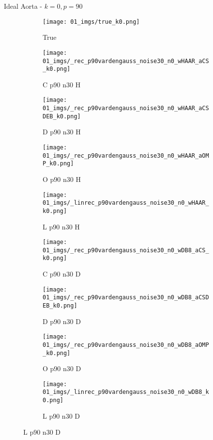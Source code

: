 \begin{frame}{Ideal Aorta - $k=0,p=90$}{}
\begin{figure}
\begin{subfigure}{0.1\textwidth}
\texttt{[image: 01\_imgs/true\_k0.png]}
\caption*{\Tiny True}
\end{subfigure}
\begin{subfigure}{0.1\textwidth}
\texttt{[image: 01\_imgs/\_rec\_p90vardengauss\_noise30\_n0\_wHAAR\_aCS\_k0.png]}
\caption*{\Tiny C p90 n30 H}
\end{subfigure}
\begin{subfigure}{0.1\textwidth}
\texttt{[image: 01\_imgs/\_rec\_p90vardengauss\_noise30\_n0\_wHAAR\_aCSDEB\_k0.png]}
\caption*{\Tiny D p90 n30 H}
\end{subfigure}
\begin{subfigure}{0.1\textwidth}
\texttt{[image: 01\_imgs/\_rec\_p90vardengauss\_noise30\_n0\_wHAAR\_aOMP\_k0.png]}
\caption*{\Tiny O p90 n30 H}
\end{subfigure}
\begin{subfigure}{0.1\textwidth}
\texttt{[image: 01\_imgs/\_linrec\_p90vardengauss\_noise30\_n0\_wHAAR\_k0.png]}
\caption*{\Tiny L p90 n30 H}
\end{subfigure}
\begin{subfigure}{0.1\textwidth}
\texttt{[image: 01\_imgs/\_rec\_p90vardengauss\_noise30\_n0\_wDB8\_aCS\_k0.png]}
\caption*{\Tiny C p90 n30 D}
\end{subfigure}
\begin{subfigure}{0.1\textwidth}
\texttt{[image: 01\_imgs/\_rec\_p90vardengauss\_noise30\_n0\_wDB8\_aCSDEB\_k0.png]}
\caption*{\Tiny D p90 n30 D}
\end{subfigure}
\begin{subfigure}{0.1\textwidth}
\texttt{[image: 01\_imgs/\_rec\_p90vardengauss\_noise30\_n0\_wDB8\_aOMP\_k0.png]}
\caption*{\Tiny O p90 n30 D}
\end{subfigure}
\begin{subfigure}{0.1\textwidth}
\texttt{[image: 01\_imgs/\_linrec\_p90vardengauss\_noise30\_n0\_wDB8\_k0.png]}
\caption*{\Tiny L p90 n30 D}
\end{subfigure}
\end{figure}
\end{frame}

